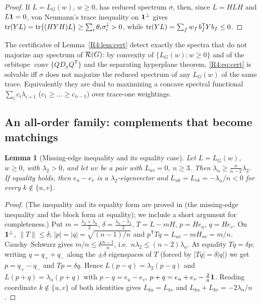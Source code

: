 \documentclass[11pt]{amsart}
\newtheorem{lemma}[theorem]{Lemma}
\theoremstyle{definition}
\theoremstyle{remark}
\begin{document}
\begin{proof}
If $L=L_G(w)$, $w\ge0$, has reduced spectrum $\sigma$, then, since
$L=HLH$ and $L\mathbf{1}=0$, von Neumann's trace inequality on $\mathbf{1}^\perp$
\cite[Ch.~III]{R4-Bhatia} gives
$\operatorname{tr}(YL)=\operatorname{tr}\bigl((HYH)L\bigr)\ge\sum_i\theta_i\sigma_i^\downarrow>0$, while
$\operatorname{tr}(YL)=\sum_f w_f\,b_f^{\mathsf T}Yb_f\le0$.
\end{proof}

The certificates of Lemma~\ref{R4:lem:cert} detect exactly the spectra
that do not majorize any spectrum of $\mathcal{R}(G)$: by convexity of
$\{L_G(w):w\ge0\}$ and of the orbitope $\operatorname{conv}\{QD_\sigma Q^{\mathsf
T}\}$ and the separating hyperplane theorem, \eqref{R4:eq:cert} is
solvable iff $\sigma$ does not majorize the reduced spectrum of any
$L_G(w)$ of the same trace.  Equivalently they are dual to maximizing a
concave spectral functional $\sum_ic_i\lambda_{i+1}$
($c_1\ge\dots\ge c_{n-1}$) over trace-one weightings.

\subsection{An all-order family: complements that become matchings}
\label{R4:subsec:matching}

\begin{lemma}[Missing-edge inequality and its equality case]\label{R4:lem:missing}
Let $L=L_G(w)$, $w\ge0$, with $\lambda_2>0$, and let $uv$ be a pair with
$L_{uv}=0$, $n\ge3$.  Then $\lambda_n\ge\frac{n}{n-2}\lambda_2$.  If
equality holds, then $e_u-e_v$ is a $\lambda_2$-eigenvector and
$L_{uk}=L_{vk}=-\lambda_n/n<0$ for every $k\notin\{u,v\}$.
\end{lemma}

\begin{proof}
(The inequality and its equality form are proved in \cite{K-015}
(the missing-edge inequality and the block form at equality); we include a
short argument for completeness.)  Put $m=\frac{\lambda_2+\lambda_n}2$,
$\delta=\frac{\lambda_n-\lambda_2}2$, $T=L-mH$, $p=He_u$, $q=He_v$.  On
$\mathbf{1}^\perp$, $\|T\|\le\delta$; $|p|=|q|=\sqrt{(n-1)/n}$ and
$p^{\mathsf T}Tq=L_{uv}-mH_{uv}=m/n$.  Cauchy--Schwarz gives
$m/n\le\delta\frac{n-1}{n}$, i.e.\ $n\lambda_2\le(n-2)\lambda_n$.  At
equality $Tq=\delta p$; writing $q=q_++q_-$ along the $\pm\delta$
eigenspaces of $T$ (forced by $|Tq|=\delta|q|$) we get $p=q_+-q_-$ and
$Tp=\delta q$.  Hence $L(p-q)=\lambda_2(p-q)$ and
$L(p+q)=\lambda_n(p+q)$ with $p-q=e_u-e_v$,
$p+q=e_u+e_v-\frac2n\mathbf{1}$.  Reading coordinate $k\notin\{u,v\}$ of both
identities gives $L_{ku}=L_{kv}$ and $L_{ku}+L_{kv}=-2\lambda_n/n$.
\end{proof}
\end{document}
